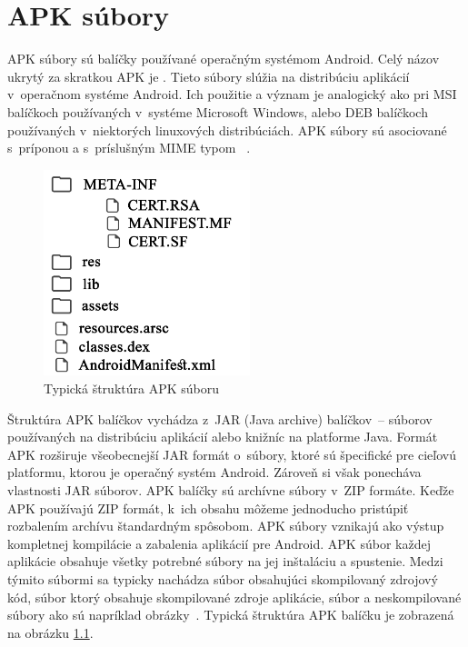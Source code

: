 \chapter{APK súbory}
\label{APKsubory}
APK súbory sú balíčky používané operačným systémom Android. Celý názov ukrytý za skratkou APK je . Tieto súbory slúžia na distribúciu aplikácií v~operačnom systéme Android. Ich použitie a význam je analogický ako pri MSI balíčkoch používaných v~systéme Microsoft Windows, alebo DEB balíčkoch používaných v~niektorých linuxových distribúciách. APK súbory sú asociované s~príponou  a s~príslušným MIME typom ~\cite{Freed2016}.

\begin{figure}[htb]
  \begin{center}
    \includegraphics[width=60mm]{images/apkStructure.pdf}
  \end{center}
  \caption{Typická štruktúra APK súboru}
  \label{fig:strukturaApk}
\end{figure}

\noindent Štruktúra APK balíčkov vychádza z~JAR (Java archive) balíčkov~-- súborov používaných na distribúciu aplikácií alebo knižníc na platforme Java. Formát APK rozširuje všeobecnejší JAR formát o~súbory, ktoré sú špecifické pre cieľovú platformu, ktorou je operačný systém Android. Zároveň si však ponecháva vlastnosti JAR súborov. APK balíčky sú archívne súbory v~ZIP formáte. Keďže APK používajú ZIP formát, k~ich obsahu môžeme jednoducho pristúpiť rozbalením archívu štandardným spôsobom.  APK súbory vznikajú ako výstup kompletnej kompilácie a zabalenia aplikácií pre Android. APK súbor každej aplikácie obsahuje všetky potrebné súbory na jej inštaláciu a spustenie. Medzi týmito súbormi sa typicky nachádza súbor  obsahujúci skompilovaný zdrojový kód, súbor  ktorý obsahuje skompilované zdroje aplikácie, súbor  a neskompilované súbory ako sú napríklad obrázky~\cite{buildingAndRunning}. Typická štruktúra APK balíčku je zobrazená na obrázku \ref{fig:strukturaApk}.

